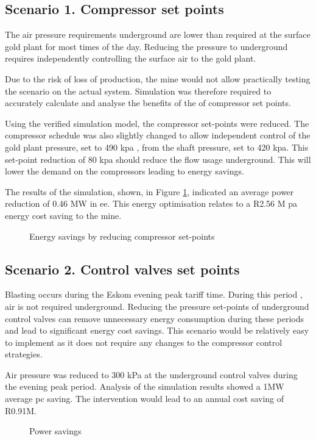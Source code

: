 \subsection{Scenario 1. Compressor set points}
The air pressure requirements underground are lower than required at the surface gold plant for most times of the day. Reducing the pressure to underground requires independently controlling the surface air to the gold plant. 
\par 
Due to the risk of loss of production, the mine would not allow practically testing the scenario on the actual system. Simulation was therefore required to accurately calculate and analyse the benefits of the of compressor set points.
\par 
Using the verified simulation model, the compressor set-points were reduced. The compressor schedule was also slightly changed to allow independent control of the gold plant pressure, set to 490 \gls{kpa} , from the shaft pressure, set to 420 \gls{kpa}. This set-point reduction of 80 \gls{kpa} should reduce the flow usage underground. This will lower the demand on the compressors leading to energy savings.
\par 
The results of the simulation, shown, in Figure \ref{fig: CompSetpoints Results Beatrix}, indicated an average power reduction of 0.46 MW in  \gls{ee}. This energy optimisation relates to a R2.56 M \gls{pa} energy cost saving to the mine. 
\par
\begin{figure}[h!]
	\centering
	
	\caption{Energy savings by reducing compressor set-points}
	\label{fig: CompSetpoints Results Beatrix}
\end{figure}

\subsection{Scenario 2. Control valves set points}
Blasting occurs during the Eskom evening peak tariff time. During this period , air is not required underground. Reducing the pressure set-points of underground control valves can remove unnecessary energy consumption during these periods and lead to significant energy cost savings. This scenario would be relatively easy to implement as it does not require any changes to the compressor control strategies.
\par 
Air pressure was reduced to 300 kPa at  the underground control valves during the evening peak period. Analysis of the simulation results showed a  1MW average \gls{pc} saving. The intervention would lead to an annual cost saving of R0.91M.
\begin{figure}[h]
	\centering
	
	\caption{Power savings}
	\label{fig: Control Valve Results Beatrix}
\end{figure}
